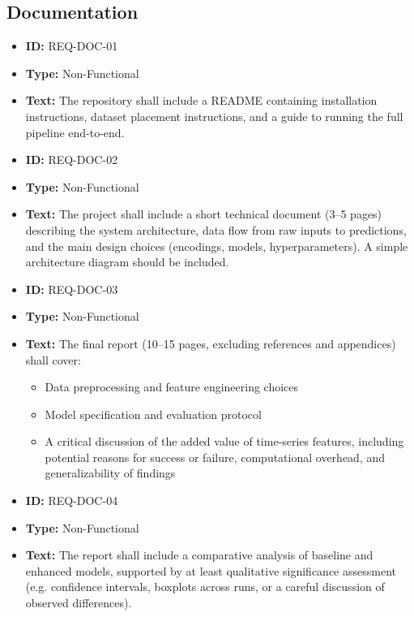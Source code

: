 \documentclass[runningheads]{llncs}
\begin{document}
\subsection{Documentation}
\begin{itemize}
    \item \textbf{ID:} REQ-DOC-01
    \item \textbf{Type:} Non-Functional
    \item \textbf{Text:} The repository shall include a README containing installation instructions, dataset placement instructions, and a guide to running the full pipeline end-to-end.

          \vspace{1em}
    \item \textbf{ID:} REQ-DOC-02
    \item \textbf{Type:} Non-Functional
    \item \textbf{Text:} The project shall include a short technical document (3--5 pages) describing the system architecture, data flow from raw inputs to predictions, and the main design choices (encodings, models, hyperparameters). A simple architecture diagram should be included.

          \vspace{1em}
    \item \textbf{ID:} REQ-DOC-03
    \item \textbf{Type:} Non-Functional
    \item \textbf{Text:} The final report (10--15 pages, excluding references and appendices) shall cover:
          \begin{itemize}
              \item Data preprocessing and feature engineering choices
              \item Model specification and evaluation protocol
              \item A critical discussion of the added value of time-series features, including potential reasons for success or failure, computational overhead, and generalizability of findings
          \end{itemize}

          \vspace{1em}
    \item \textbf{ID:} REQ-DOC-04
    \item \textbf{Type:} Non-Functional
    \item \textbf{Text:} The report shall include a comparative analysis of baseline and enhanced models, supported by at least qualitative significance assessment (e.g. confidence intervals, boxplots across runs, or a careful discussion of observed differences).
\end{itemize}
\end{document}
